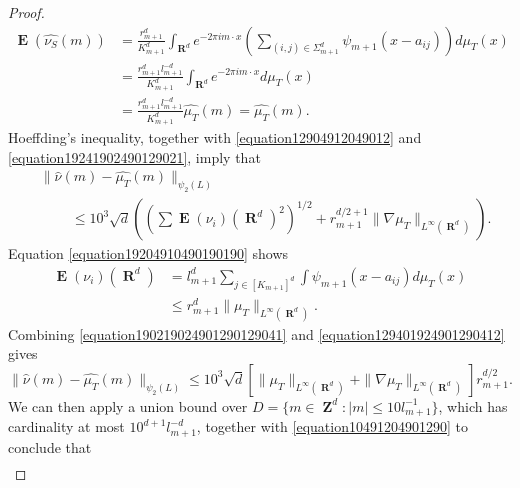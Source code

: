 \documentclass[12pt,reqno]{article}
\DeclareMathOperator{\RR}{\mathbf{R}}
\DeclareMathOperator{\ZZ}{\mathbf{Z}}
\DeclareMathOperator{\EE}{\mathbf{E}}
\newcommand{\psitwo}[1]{\| {#1} \|_{\psi_2(L)}}
\begin{document}
\begin{proof}
\begin{equation}
    \begin{split}
        \EE(\widehat{\nu_S}(m)) &= \frac{r_{m+1}^d}{K_{m+1}^d} \int_{\RR^d} e^{-2 \pi i m \cdot x} \left( \sum_{(i,j) \in \Sigma_{m+1}^d} \psi_{m+1}(x - a_{ij}) \right) d\mu_T(x)\\
        &= \frac{r_{m+1}^d l_{m+1}^{-d}}{K_{m+1}^d} \int_{\RR^d} e^{-2 \pi i m \cdot x} d\mu_T(x)\\
        &= \frac{r_{m+1}^d l_{m+1}^{-d}}{K_{m+1}^d} \widehat{\mu_T}(m) = \widehat{\mu_T}(m).
    \end{split}
    \end{equation}
    Hoeffding's inequality, together with \eqref{equation12904912049012} and \eqref{equation19241902490129021}, imply that
    \begin{equation} \label{equation190219024901290129041}
    \begin{split}
        & \psitwo{\widehat{\nu}(m) - \widehat{\mu_T}(m)}\\
        &\ \ \ \ \ \ \ \ \ \ \leq 10^3 \sqrt{d} \left( \left( \sum \EE(\nu_i)(\RR^d)^2 \right)^{1/2} + r_{m+1}^{d/2+1} \| \nabla \mu_T \|_{L^\infty(\RR^d)} \right).
    \end{split}
    \end{equation}
    Equation \eqref{equation19204910490190190} shows
    \begin{equation} \label{equation129401924901290412}
    \begin{split}
        \EE(\nu_i)(\RR^d) &= l_{m+1}^d \sum_{j \in [K_{m+1}]^d} \int \psi_{m+1}(x - a_{ij}) d\mu_T(x)\\
        &\leq r_{m+1}^d \| \mu_T \|_{L^\infty(\RR^d)}.
    \end{split}
    \end{equation}
    Combining \eqref{equation190219024901290129041} and \eqref{equation129401924901290412} gives
    \begin{equation} \label{equation10491204901290}
        \psitwo{\widehat{\nu}(m) - \widehat{\mu_T}(m)} \leq 10^3 \sqrt{d} \left[ \| \mu_T \|_{L^\infty(\RR^d)} + \| \nabla \mu_T \|_{L^\infty(\RR^d)} \right] r_{m+1}^{d/2}.
    \end{equation}
    We can then apply a union bound over $D = \{ m \in \ZZ^d : |m| \leq 10 l_{m+1}^{-1} \}$, which has cardinality at most $10^{d+1} l_{m+1}^{-d}$, together with \eqref{equation10491204901290} to conclude that
    \begin{equation} \label{equation1290421941021290}
    \begin{split}

\end{split}
\end{equation}
\end{proof}
\end{document}
